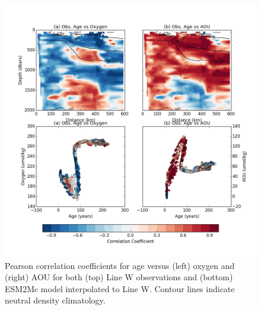 \documentclass[11pt]{article} %
\begin{document}
\begin{figure}
\noindent
\centering
\includegraphics[width=43pc]{age_oxygen_correlation.png}
\caption{Pearson correlation coefficients for age versus (left) oxygen and (right)
AOU for both (top) Line W observations and (bottom) ESM2Mc model interpolated to
Line W. Contour lines indicate neutral density climatology.}
\label{fig:obs_age_o2_contour}
\end{figure}
\end{document}
